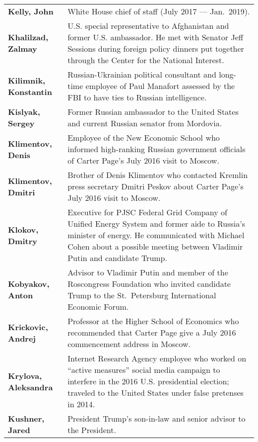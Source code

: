 \begin{longtable}{ p{} p{} }
    \textbf{Kelly, John} & White House chief of staff (July 2017 — Jan.~2019). \\

    \textbf{Khalilzad, Zalmay} & U.S. special representative to Afghanistan and former U.S. ambassador. He met with Senator Jeff Sessions during foreign policy dinners put together through the Center for the National Interest. \\

    \textbf{Kilimnik, Konstantin} & Russian-Ukrainian political consultant and long-time employee of Paul Manafort assessed by the FBI to have ties to Russian intelligence. \\

    \textbf{Kislyak, Sergey} & Former Russian ambassador to the United States and current Russian senator from Mordovia. \\

    \textbf{Klimentov, Denis} & Employee of the New Economic School who informed high-ranking Russian government officials of Carter Page’s July 2016 visit to Moscow. \\

    \textbf{Klimentov, Dmitri} & Brother of Denis Klimentov who contacted Kremlin press secretary Dmitri Peskov about Carter Page’s July 2016 visit to Moscow. \\

    \textbf{Klokov, Dmitry} & Executive for PJSC Federal Grid Company of Unified Energy System and former aide to Russia’s minister of energy. He communicated with Michael Cohen about a possible meeting between Vladimir Putin and candidate Trump. \\

    \textbf{Kobyakov, Anton} & Advisor to Vladimir Putin and member of the Roscongress Foundation who invited candidate Trump to the St.~Petersburg International Economic Forum. \\

    \textbf{Krickovic, Andrej} & Professor at the Higher School of Economics who recommended that Carter Page give a July 2016 commencement address in Moscow. \\

    \textbf{Krylova, Aleksandra} & Internet Research Agency employee who worked on “active measures” social media campaign to interfere in the 2016 U.S. presidential election; traveled to the United States under false pretenses in 2014. \\

    \textbf{Kushner, Jared} & President Trump’s son-in-law and senior advisor to the President. \\


\end{longtable}
